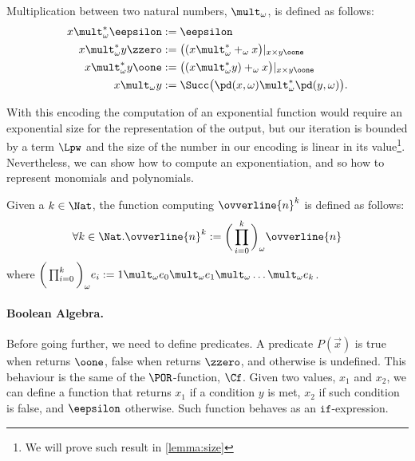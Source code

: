 \begin{defn}[{Multiplication}]
Multiplication between two natural numbers,
{$\mult_\omega$}, is defined
as follows:
\begin{align*}
x {\mult_\omega^*} \eepsilon &:= \eepsilon \\
x \mult_\omega^* y\zzero &:= \big((x\mult_\omega^* +_\omega
x\big)|_{x\times y\oone} \\
x \mult_\omega^* y\oone &:= \big((x\mult^*_\omega y)
+_\omega x\big) |_{x\times y\oone} \\
x \mult_\omega y &:= \Succ\big(\pd(x,\omega) \mult^*_\omega
\pd(y,\omega)\big).
\end{align*}
\end{defn}
%
%
\noindent
{With this encoding the computation of an exponential function
would require an exponential size for the representation
of the output, but our iteration is bounded by a term $\Lpw$
and the size of the number in our encoding is
linear in its value\footnote{We will prove such result in \ref{lemma:size}}.}
Nevertheless, we can show how to compute an exponentiation, and so
how to represent monomials and polynomials.

\begin{defn}[Monomials]
Given a $k\in \Nat$, the function computing
{$\ovverline{n}^k$}
is defined as follows:
$$
{\forall k\in \Nat.\ovverline{n}^k := \bigg(\prod^k_{i=0}\bigg)_\omega}
\ovverline{n}
$$
where $\bigg(\prod^k_{i=0}\bigg)_\omega e_i :=
1\mult_\omega
e_0 \mult_\omega e_1 \mult_\omega
\dots \mult_\omega e_k$.
\end{defn}













\paragraph{Boolean Algebra.}
Before going further, we need to define predicates.
A predicate $P(\vec{x})$
is true when returns $\oone$,
false when returns $\zzero$,
and otherwise is undefined.
%
{This behaviour is the same of the $\POR$-function,
$\Cf$.}
%
Given two values, $x_1$ and $x_2$,
we can define a function that
returns $x_1$ if a condition $y$
is met, $x_2$ if such condition is false,
and $\eepsilon$ otherwise.
Such function behaves as an $\mathtt{if}$-expression.



